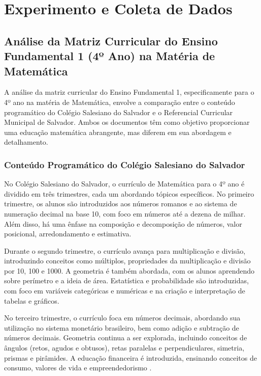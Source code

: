 \chapter{Experimento e Coleta de Dados}\label{chp:exp}

\section{Análise da Matriz Curricular do Ensino Fundamental 1 (4º Ano) na Matéria de Matemática}

A análise da matriz curricular do Ensino Fundamental 1, especificamente para o 4º ano na matéria de Matemática, envolve a comparação entre o conteúdo programático do Colégio Salesiano do Salvador e o Referencial Curricular Municipal de Salvador. Ambos os documentos têm como objetivo proporcionar uma educação matemática abrangente, mas diferem em sua abordagem e detalhamento.

\subsection{Conteúdo Programático do Colégio Salesiano do Salvador}

No Colégio Salesiano do Salvador, o currículo de Matemática para o 4º ano é dividido em três trimestres, cada um abordando tópicos específicos. No primeiro trimestre, os alunos são introduzidos aos números romanos e ao sistema de numeração decimal na base 10, com foco em números até a dezena de milhar. Além disso, há uma ênfase na composição e decomposição de números, valor posicional, arredondamento e estimativa.

Durante o segundo trimestre, o currículo avança para multiplicação e divisão, introduzindo conceitos como múltiplos, propriedades da multiplicação e divisão por 10, 100 e 1000. A geometria é também abordada, com os alunos aprendendo sobre perímetro e a ideia de área. Estatística e probabilidade são introduzidas, com foco em variáveis categóricas e numéricas e na criação e interpretação de tabelas e gráficos.

No terceiro trimestre, o currículo foca em números decimais, abordando sua utilização no sistema monetário brasileiro, bem como adição e subtração de números decimais. Geometria continua a ser explorada, incluindo conceitos de ângulos (retos, agudos e obtusos), retas paralelas e perpendiculares, simetria, prismas e pirâmides. A educação financeira é introduzida, ensinando conceitos de consumo, valores de vida e empreendedorismo \cite{conteudo_programatico_salesiano}.


